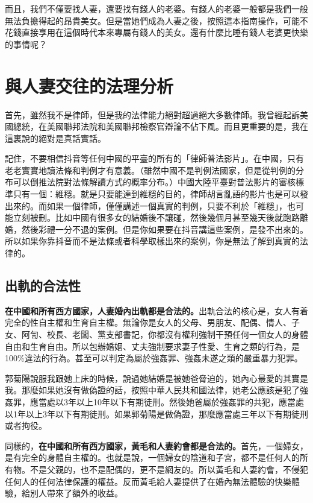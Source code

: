 而且，我們不僅要找人妻，還要找有錢人的老婆。有錢人的老婆一般都是我們一般無法負擔得起的昂貴美女。但是當她們成為人妻之後，按照這本指南操作，可能不花錢直接享用在這個時代本來專屬有錢人的美女。還有什麼比睡有錢人老婆更快樂的事情呢？

\section{與人妻交往的法理分析}

首先，雖然我不是律師，但是我的法律能力絕對超過絕大多數律師。我曾經起訴美國總統，在美國聯邦法院和美國聯邦檢察官辯論不佔下風。而且更重要的是，我在這裏說的絕對是真話實話。

記住，不要相信抖音等任何中國的平臺的所有的「律師普法影片」。在中國，只有老老實實地讀法條和判例才有意義。（雖然中國不是判例法國家，但是從判例的分布可以倒推法院對法條解讀方式的概率分布。）中國大陸平臺對普法影片的審核標準只有一個：維穩。就是只要能達到維穩的目的，律師胡言亂語的影片也是可以發出來的。而如果一個律師，僅僅講述一個真實的判例，只要不利於「維穩」，也可能立刻被刪。比如中國有很多女的結婚後不讓碰，然後幾個月甚至幾天後就跑路離婚，然後彩禮一分不退的案例。但是你如果要在抖音講這些案例，是發不出來的。所以如果你靠抖音而不是法條或者科學取樣出來的案例，你是無法了解到真實的法律的。

\subsection{出軌的合法性}

\textbf{在中國和所有西方國家，人妻婚內出軌都是合法的。}出軌合法的核心是，女人有着完全的性自主權和生育自主權。無論你是女人的父母、男朋友、配偶、情人、子女、阿訇、校長、老闆、黨支部書記，你都沒有權利強制干預任何一個女人的身體自由和生育自由。所以包辦婚姻、丈夫強制要求妻子性愛、生育之類的行為，是100\%違法的行為。甚至可以判定為屬於強姦罪、強姦未遂之類的嚴重暴力犯罪。

郭菊陽說服我跟她上床的時候，說過她結婚是被她爸脅迫的，她內心最愛的其實是我。那麼如果她沒有做偽證的話，按照中華人民共和國法律，她老公應該是犯了強姦罪，應當處以3年以上10年以下有期徒刑。然後她爸屬於強姦罪的共犯，應當處以1年以上3年以下有期徒刑。如果郭菊陽是做偽證，那麼應當處三年以下有期徒刑或者拘役。

同樣的，\textbf{在中國和所有西方國家，黃毛和人妻約會都是合法的。}首先，一個婦女，是有完全的身體自主權的。也就是說，一個婦女的陰道和子宮，都不是任何人的所有物。不是父親的，也不是配偶的，更不是網友的。所以黃毛和人妻約會，不侵犯任何人的任何法律保護的權益。反而黃毛給人妻提供了在婚內無法體驗的快樂體驗，給別人帶來了額外的收益。

